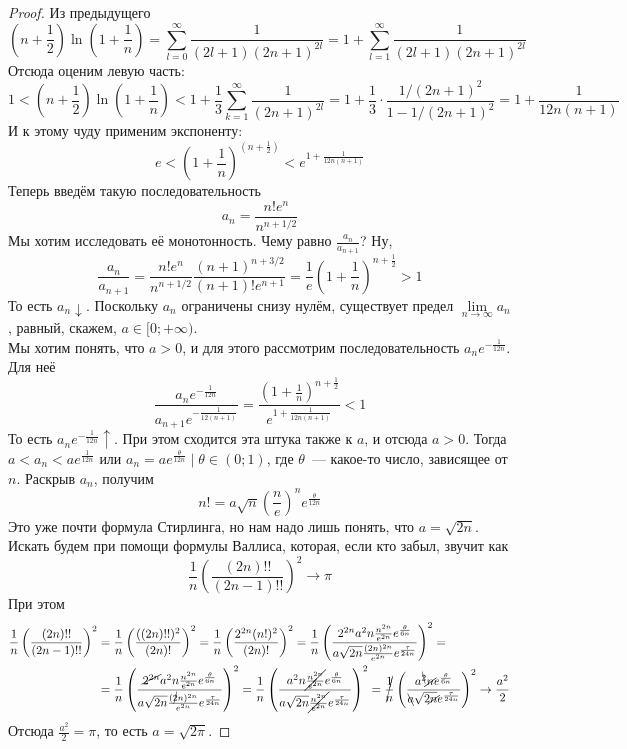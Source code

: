 \documentclass{article}
\begin{document}
    \begin{proof}
        Из предыдущего
        $$
        \left(n+\frac12\right)\ln\left(1+\frac1n\right)=\sum\limits_{l=0}^\infty\frac1{(2l+1)(2n+1)^{2l}}=1+\sum\limits_{l=1}^\infty\frac1{(2l+1)(2n+1)^{2l}}
        $$
        Отсюда оценим левую часть:
        $$
        1<\left(n+\frac12\right)\ln\left(1+\frac1n\right)<1+\frac13\sum\limits_{k=1}^\infty\frac1{(2n+1)^{2l}}=1+\frac13\cdot\frac{1/(2n+1)^2}{1-1/(2n+1)^2}=1+\frac1{12n(n+1)}
        $$
        И к этому чуду применим экспоненту:
        $$
        e<\left(1+\frac1n\right)^{\left(n+\frac12\right)}<e^{1+\frac1{12n(n+1)}}
        $$
        Теперь введём такую последовательность
        $$
        a_n=\frac{n!e^n}{n^{n+1/2}}
        $$
        Мы хотим исследовать её монотонность. Чему равно $\frac{a_n}{a_{n+1}}$? Ну,
        $$
        \frac{a_n}{a_{n+1}}=\frac{n!e^n}{n^{n+1/2}}\frac{(n+1)^{n+3/2}}{(n+1)!e^{n+1}}=\frac1e\left(1+\frac1n\right)^{n+\frac12}>1
        $$
        То есть $a_n\downarrow$. Поскольку $a_n$ ограничены снизу нулём, существует предел $\lim\limits_{n\to\infty}a_n$, равный, скажем, $a\in[0;+\infty)$.\\
        Мы хотим понять, что $a>0$, и для этого рассмотрим последовательность $a_ne^{-\frac1{12n}}$. Для неё
        $$
        \frac{a_ne^{-\frac1{12n}}}{a_{n+1}e^{-\frac1{12(n+1)}}}=\frac{\left(1+\frac1n\right)^{n+\frac12}}{e^{1+\frac1{12n(n+1)}}}<1
        $$
        То есть $a_ne^{-\frac1{12n}}\uparrow$. При этом сходится эта штука также к $a$, и отсюда $a>0$. Тогда $a<a_n<ae^{\frac1{12n}}$ или $a_n=ae^{\frac\theta{12n}}\mid\theta\in(0;1)$, где $\theta$~--- какое-то число, зависящее от $n$. Раскрыв $a_n$, получим
        $$
        n!=a\sqrt n\left(\frac ne\right)^ne^{\frac\theta{12n}}
        $$
        Это уже почти формула Стирлинга, но нам надо лишь понять, что $a=\sqrt{2n}$. Искать будем при помощи формулы Валлиса, которая, если кто забыл, звучит как
        $$
        \frac1n\left(\frac{(2n)!!}{(2n-1)!!}\right)^2\longrightarrow\pi
        $$
        При этом
        \[\begin{split}
            \frac1n\left(\frac{(2n)!!}{(2n-1)!!}\right)^2&=\frac1n\left(\frac{((2n)!!)^2}{(2n)!}\right)^2=\frac1n\left(\frac{2^{2n}(n!)^2}{(2n)!}\right)^2=\frac1n\left(\frac{2^{2n}a^2n\frac{n^{2n}}{e^{2n}}e^{\frac\theta{6n}}}{a\sqrt{2n}\frac{(2n)^{2n}}{e^{2n}}e^{\frac\tau{24n}}}\right)^2=\\
            &=\frac1n\left(\frac{\cancel{2^{2n}}a^2n\frac{n^{2n}}{e^{2n}}e^{\frac\theta{6n}}}{a\sqrt{2n}\frac{(\cancel{2}n)^{2n}}{e^{2n}}e^{\frac\tau{24n}}}\right)^2=\frac1n\left(\frac{a^2n\cancel{\frac{n^{2n}}{e^{2n}}}e^{\frac\theta{6n}}}{a\sqrt{2n}\cancel{\frac{n^{2n}}{e^{2n}}}e^{\frac\tau{24n}}}\right)^2=\cancel{\frac1n}\left(\frac{a^{\bcancel{2}}\cancel{n}e^{\frac\theta{6n}}}{\bcancel{a}\sqrt{2\cancel{n}}e^{\frac\tau{24n}}}\right)^2\rightarrow\frac{a^2}2
        \end{split}\]
        Отсюда $\frac{a^2}2=\pi$, то есть $a=\sqrt{2\pi}$.
    \end{proof}
\end{document}
